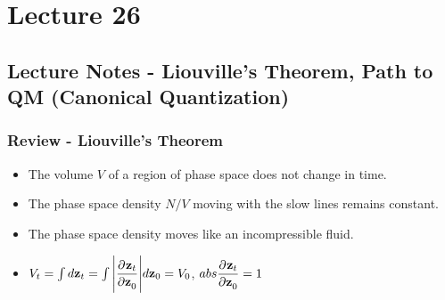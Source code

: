 \section{Lecture 26}
\subsection{Lecture Notes - Liouville's Theorem, Path to QM (Canonical Quantization)}
\subsubsection{Review - Liouville's Theorem}
\begin{itemize}
    \item The volume $V$ of a region of phase space does not change in time.
    \item The phase space density $N/V$ moving with the slow lines remains constant.
    \item The phase space density moves like an incompressible fluid.
    \item $V_t = \int d\v{z}_t = \int\abs{\dpd{\v{z}_t}{\v{z}_0}}d\v{z}_0 = V_0$, $abs{\dpd{\v{z}_t}{\v{z}_0}} = 1$
\end{itemize}

